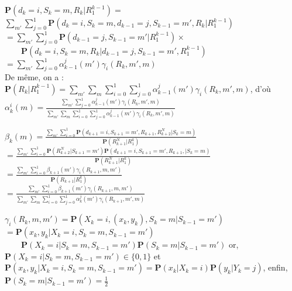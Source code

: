 \documentclass[11pt]{beamer}
\begin{document}
\begin{frame}
	$\mathbf{P}(d_k=i,S_k=m,R_k|R_1^{k-1})=$\\
	$\sum\limits_{m'}\sum\limits_{j=0}^1\mathbf{P}(d_k=i,S_k=m,d_{k-1}=j,S_{k-1}=m',R_k|R_1^{k-1})$\\
	$=\sum\limits_{m'}\sum\limits_{j=0}^1\mathbf{P}(d_{k-1}=j,S_{k-1}=m'|R_1^{k-1})\times$\\
	$\qquad\mathbf{P}(d_k=i,S_k=m,R_k|d_{k-1}=j,S_{k-1}=m',R_1^{k-1})$\\
	$=\sum\limits_{m'}\sum\limits_{j=0}^1\alpha_{k-1}^j(m')\gamma_i(R_k, m', m)$\\
	De m\^eme, on a :\\
	$\mathbf{P}(R_k|R_1^{k-1})=\sum\limits_{m'}\sum\limits_{m}\sum\limits_{i=0}^1\sum\limits_{j=0}^1\alpha_{k-1}^j(m')\gamma_i(R_k, m', m)$, d'o\`u\\
	$\alpha_k^i(m)=\frac{\sum\limits_{m'}\sum\limits_{j=0}^1\alpha_{k-1}^j(m')\gamma_i(R_k,m',m)}{\sum\limits_{m'}\sum\limits_{m}\sum\limits_{i=0}^1\sum\limits_{j=0}^1\alpha_{k-1}^j(m')\gamma_i(R_k, m', m)}$
\end{frame}

\begin{frame}
	$\beta_k(m)=\frac{\sum\limits_{m'}\sum\limits_{i=0}^1\mathbf{P}(d_{k+1}=i,S_{k+1}=m',R_{k+1},R_{k+2}^N|S_k=m)}{\mathbf{P}(R_{k+1}^N|R_1^k)}$\\
	$=\frac{\sum\limits_{m'}\sum\limits_{i=0}^1\mathbf{P}(R_{k+2}^N|S_{k+1}=m')\mathbf{P}(d_{k+1}=i,S_{k+1}=m',R_{k+1},|S_k=m)}{\mathbf{P}(R_{k+1}^N|R_1^k)}$\\
	$=\frac{\sum\limits_{m'}\sum\limits_{i=0}^1\beta_{k+1}(m')\gamma_i(R_{k+1},m,m')}{\mathbf{P}(R_{k+1}|R_1^k)}$\\
	$=\frac{\sum\limits_{m'}\sum\limits_{i=0}^1\beta_{k+1}(m')\gamma_i(R_{k+1},m,m')}{\sum\limits_{m'}\sum\limits_{m}\sum\limits_{i=0}^1\sum\limits_{j=0}^1\alpha_{k}^j(m')\gamma_i(R_{k+1}, m', m)}$
\end{frame}

\begin{frame}
	$\gamma_i(R_k,m,m')=\mathbf{P}(X_k=i,(x_k,y_k),S_k=m|S_{k-1}=m')$\\
	$=\mathbf{P}(x_k,y_k|X_k=i,S_k=m,S_{k-1}=m')$\\
	$\qquad\mathbf{P}(X_k=i|S_k=m,S_{k-1}=m')\mathbf{P}(S_k=m|S_{k-1}=m')$ or,\\
	$\mathbf{P}(X_k=i|S_k=m,S_{k-1}=m') \in \{0,1\}$ et\\
	$\mathbf{P}(x_k,y_k|X_k=i,S_k=m,S_{k-1}=m')=\mathbf{P}(x_k|X_k=i)\mathbf{P}(y_k|Y_k=j)$, enfin,\\
	$\mathbf{P}(S_k=m|S_{k-1}=m')=\frac{1}{2}$
\end{frame}
\end{document}
